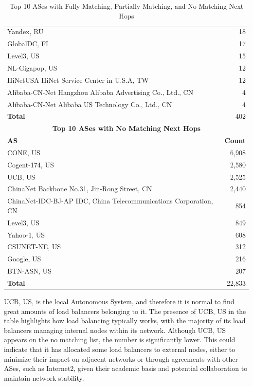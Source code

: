 \documentclass[12pt]{cwru_thesis}
\begin{document}
\begin{table}[h!]
\begin{tabular}{|l|r|}
        Yandex, RU & 18 \\
        GlobalDC, FI & 17 \\
        Level3, US & 15 \\
        NL-Gigapop, US & 12 \\
        HiNetUSA HiNet Service Center in U.S.A, TW & 12 \\
        Alibaba-CN-Net Hangzhou Alibaba Advertising Co., Ltd., CN & 4 \\
        Alibaba-CN-Net Alibaba US Technology Co., Ltd., CN & 4 \\
        \hline
        \textbf{Total} & 402 \\
        \hline
        \multicolumn{2}{|c|}{\textbf{Top 10 ASes with No Matching Next Hops}} \\
        \hline
        \textbf{AS} & \textbf{Count} \\
        \hline
        CONE, US & 6,908 \\
        Cogent-174, US & 2,580 \\
        UCB, US & 2,525 \\
        ChinaNet Backbone No.31, Jin-Rong Street, CN & 2,440 \\
        ChinaNet-IDC-BJ-AP IDC, China Telecommunications Corporation, CN & 854 \\
        Level3, US & 849 \\
        Yahoo-1, US & 608 \\
        CSUNET-NE, US & 312 \\
        Google, US & 216 \\
        BTN-ASN, US & 207 \\
        \hline
        \textbf{Total} & 22,833 \\
        \hline
    \end{tabular}
    \caption{Top 10 ASes with Fully Matching, Partially Matching, and No Matching Next Hops}
    \label{tab:match_no_match}
\end{table}


\newpage


UCB, US, is the local Autonomous System, and therefore it is normal to find great amounts of load balancers belonging to it. The presence of UCB, US in the table highlights how load balancing typically works, with the majority of its load balancers managing internal nodes within its network. Although UCB, US appears on the no matching list, the number is significantly lower. This could indicate that it has allocated some load balancers to external nodes, either to minimize their impact on adjacent networks or through agreements with other ASes, such as Internet2, given their academic basis and potential collaboration to maintain network stability.
\end{document}
